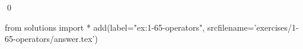 
\begin{ex}
  \label{ex:1-65-operators}
  
  \qed
\end{ex}
\begin{python0}
from solutions import *
add(label="ex:1-65-operators",
    srcfilename='exercises/1-65-operators/answer.tex')
\end{python0}
